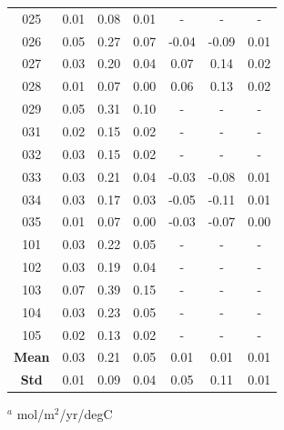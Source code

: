 \documentclass[12pt]{article}
\begin{document}
\begin{table}[!h]
\begin{tabular}{c c c c | c c c}
		025 &   0.01 &     0.08 &       0.01 &    - &      - &        - \\
		026 &   0.05 &     0.27 &       0.07 &  -0.04 &    -0.09 &       0.01 \\
		027 &   0.03 &     0.20 &       0.04 &   0.07 &     0.14 &       0.02 \\
		028 &   0.01 &     0.07 &       0.00 &   0.06 &     0.13 &       0.02 \\
		029 &   0.05 &     0.31 &       0.10 &    - &      - &        - \\
		031 &   0.02 &     0.15 &       0.02 &    - &      - &        - \\
		032 &   0.03 &     0.15 &       0.02 &    - &      - &        - \\
		033 &   0.03 &     0.21 &       0.04 &  -0.03 &    -0.08 &       0.01 \\
		034 &   0.03 &     0.17 &       0.03 &  -0.05 &    -0.11 &       0.01 \\
		035 &   0.01 &     0.07 &       0.00 &  -0.03 &    -0.07 &       0.00 \\
		101 &   0.03 &     0.22 &       0.05 &    - &      - &        - \\
		102 &   0.03 &     0.19 &       0.04 &    - &      - &        - \\
		103 &   0.07 &     0.39 &       0.15 &    - &      - &        - \\
		104 &   0.03 &     0.23 &       0.05 &    - &      - &        - \\
		105 &   0.02 &     0.13 &       0.02 &    - &      - &        - \\
		\bottomrule
		\textbf{Mean} & 0.03 & 0.21 & 0.05 & 0.01 & 0.01 & 0.01 \\
		\textbf{Std} & 0.01 & 0.09 & 0.04 & 0.05 & 0.11 & 0.01
	\end{tabular}
	\begin{tablenotes}
		\centering
		\item $^{a}$ mol/m$^{2}$/yr/degC
	\end{tablenotes}
	\label{tab:enso-atlantic}
\end{table}
\end{document}
